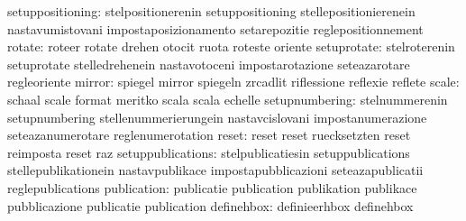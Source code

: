                 setuppositioning: stelpositionerenin               setuppositioning
                                  stellepositionierenein           nastavumistovani
                                  impostaposizionamento            setarepozitie
                                  reglepositionnement
                          rotate: roteer                           rotate
                                  drehen                           otocit
                                  ruota                            roteste
                                  oriente
                     setuprotate: stelroterenin                    setuprotate
                                  stelledrehenein                  nastavotoceni
                                  impostarotazione                 seteazarotare
                                  regleoriente
                          mirror: spiegel                          mirror
                                  spiegeln                         zrcadlit
                                  riflessione                      reflexie
                                  reflete
                           scale: schaal                           scale
                                  format                           meritko
                                  scala                            scala
                                  echelle
                  setupnumbering: stelnummerenin                   setupnumbering
                                  stellenummerierungein            nastavcislovani
                                  impostanumerazione               seteazanumerotare
                                  reglenumerotation
                           reset: reset                            reset
                                  ruecksetzten                     reset
                                  reimposta                        reset
                                  raz
               setuppublications: stelpublicatiesin                setuppublications
                                  stellepublikationein             nastavpublikace
                                  impostapubblicazioni             seteazapublicatii
                                  reglepublications
                     publication: publicatie                       publication
                                  publikation                      publikace
                                  pubblicazione                    publicatie
                                  publication
                      definehbox: definieerhbox                    definehbox
